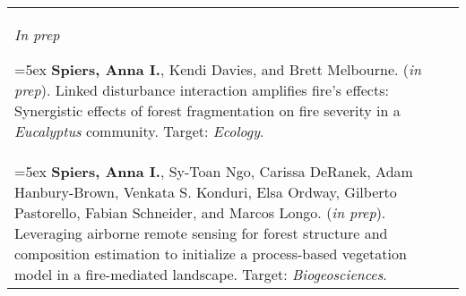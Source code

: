 \begin{longtable}{@{} >{\raggedright}p{6.10in} >{\raggedleft}X @{}}

\emph{In prep}

\hangindent=5ex \textbf{Spiers, Anna I.}, Kendi Davies, and Brett Melbourne. (\emph{in prep}). Linked disturbance interaction amplifies fire's effects: Synergistic effects of forest fragmentation on fire severity in a \emph{Eucalyptus} community. Target: \emph{Ecology}. & \tabularnewline

\hangindent=5ex \textbf{Spiers, Anna I.}, Sy-Toan Ngo, Carissa DeRanek, Adam Hanbury-Brown, Venkata S. Konduri, Elsa Ordway, Gilberto Pastorello, Fabian Schneider, and Marcos Longo. (\emph{in prep}). Leveraging airborne remote sensing for forest structure and composition estimation to initialize a process-based vegetation model in a fire-mediated landscape. Target: \emph{Biogeosciences}. & \tabularnewline

\end{longtable}

